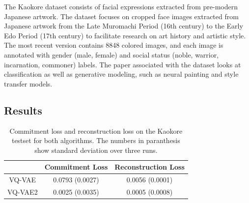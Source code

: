 \documentclass{article}
\begin{document}
The Kaokore dataset consists of facial expressions extracted from pre-modern Japanese artwork. The dataset focuses on cropped face images extracted from Japanese artwork from the Late Muromachi Period (16th century) to the Early Edo Period (17th century) to facilitate research on art history and artistic style. The most recent version contains 8848 colored images, and each image is annotated with gender (male, female) and social status (noble, warrior, incarnation, commoner) labels. The paper associated with the dataset looks at classification as well as generative modeling, such as neural painting and style transfer models. 

\subsection{Results}

\begin{table}[H]
    \centering
    \begin{tabular}{c c c}
        & Commitment Loss & Reconstruction Loss \\
        \hline
        VQ-VAE & 0.0793 (0.0027) & 0.0056 (0.0001) \\
        VQ-VAE2 & 0.0025 (0.0035) & 0.0005 (0.0008)
    \end{tabular}
    \label{table:loss}
    \caption{Commitment loss and reconstruction loss on the Kaokore testset for both algorithms. The numbers in paranthesis show standard deviation over three runs.}
\end{table}
\end{document}

